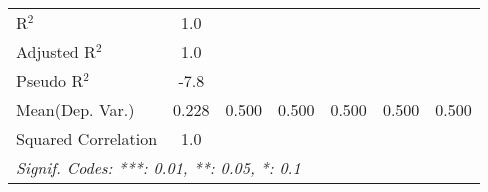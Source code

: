 \begin{tabular}{lcccccc}
   R$^2$                         & 1.0            &     &     &     &     & \\  
   Adjusted R$^2$                & 1.0            &     &     &     &     & \\  
   Pseudo R$^2$                  & -7.8           &     &     &     &     & \\  
Mean(Dep. Var.) & 0.228 & 0.500 & 0.500 & 0.500 & 0.500 & 0.500 \\
   Squared Correlation           & 1.0            &     &     &     &     & \\  
   \midrule \midrule
   \multicolumn{7}{l}{\emph{Signif. Codes: ***: 0.01, **: 0.05, *: 0.1}}\\
\end{tabular}
\par\endgroup
